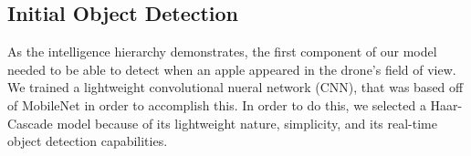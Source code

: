 \subsection{Initial Object Detection}
As the intelligence hierarchy demonstrates, the first component of our model needed to be able to detect when an apple appeared in the drone's field of view. 
We trained a lightweight convolutional nueral network (CNN), that was based off of MobileNet in order to accomplish this. 
In order to do this, we selected a Haar-Cascade model because of its lightweight nature, simplicity, and its real-time object detection capabilities. 